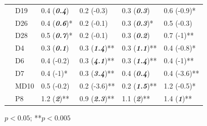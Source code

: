 \documentclass[journal = esthag, manuscript = article]{achemso}\usepackage[]{graphicx}\usepackage[]{color}
\begin{document}
\begin{suppinfo}
\begin{table}[!tbp]
\begin{center}
\begin{tabular}{lllll}
~~D19&0.4 \footnotesize{(\textit{\textbf{0.4}})}&0.2 \footnotesize{(-0.3)}&0.3 \footnotesize{(\textit{\textbf{0.3}})}&0.6 \footnotesize{(-0.9)*}\tabularnewline
~~D26&0.4 \footnotesize{(\textit{\textbf{0.6}})*}&0.2 \footnotesize{(-0.1)}&0.3 \footnotesize{(\textit{\textbf{0.3}})*}&0.5 \footnotesize{(-0.3)}\tabularnewline
~~D28&0.5 \footnotesize{(\textit{\textbf{0.7}})*}&0.2 \footnotesize{(-0.1)}&0.3 \footnotesize{(\textit{\textbf{0.2}})}&0.7 \footnotesize{(-1)**}\tabularnewline
~~D4&0.3 \footnotesize{(\textit{\textbf{0.1}})}&0.3 \footnotesize{(\textit{\textbf{1.4}})**}&0.3 \footnotesize{(\textit{\textbf{1.1}})**}&0.4 \footnotesize{(-0.8)*}\tabularnewline
~~D6&0.4 \footnotesize{(-0.2)}&0.3 \footnotesize{(\textit{\textbf{4.1}})**}&0.3 \footnotesize{(\textit{\textbf{1.4}})**}&0.4 \footnotesize{(-1)**}\tabularnewline
~~D7&0.4 \footnotesize{(-1)*}&0.3 \footnotesize{(\textit{\textbf{3.4}})**}&0.4 \footnotesize{(\textit{\textbf{0.4}})}&0.4 \footnotesize{(-3.6)**}\tabularnewline
~~MD10&0.5 \footnotesize{(-0.2)}&0.2 \footnotesize{(-3.6)**}&0.2 \footnotesize{(\textit{\textbf{1.5}})**}&1.2 \footnotesize{(-0.5)*}\tabularnewline
~~P8&1.2 \footnotesize{(\textit{\textbf{2}})**}&0.9 \footnotesize{(\textit{\textbf{2.3}})**}&1.1 \footnotesize{(\textit{\textbf{2}})**}&1.4 \footnotesize{(\textit{\textbf{1}})**}\tabularnewline
\hline
\end{tabular}\end{center}

\footnotesize *$p<0.05$; **$p<0.005$\end{table}



\end{suppinfo}
\end{document}

